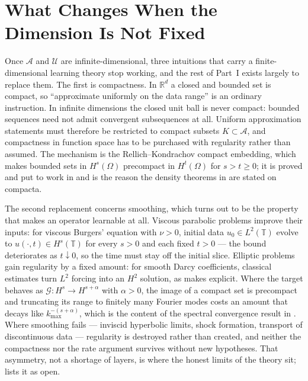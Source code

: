 \section{What Changes When the Dimension Is Not Fixed}

Once $\mathcal{A}$ and $\mathcal{U}$ are infinite-dimensional, three intuitions that carry a
finite-dimensional learning theory stop working, and the rest of Part~I exists largely to
replace them. The first is compactness. In $\mathbb{R}^{d}$ a closed and bounded set is
compact, so ``approximate uniformly on the data range'' is an ordinary instruction. In
infinite dimensions the closed unit ball is never compact: bounded sequences need not admit
convergent subsequences at all. Uniform approximation statements must therefore be restricted
to compact subsets $K \subset \mathcal{A}$, and compactness in function space has to be
purchased with regularity rather than assumed. The mechanism is the Rellich--Kondrachov
compact embedding, which makes bounded sets in $H^{s}(\Omega)$ precompact in
$H^{t}(\Omega)$ for $s > t \ge 0$; it is proved and put to work in
 and is the reason the density
theorems in  are stated on
compacta. 

The second replacement concerns smoothing, which turns out to be the property that makes an
operator learnable at all. Viscous parabolic problems improve their inputs: for viscous
Burgers' equation with $\nu > 0$, initial data $u_{0} \in L^{2}(\mathbb{T})$ evolve to
$u(\cdot, t) \in H^{s}(\mathbb{T})$ for every $s > 0$ and each fixed $t > 0$ --- the
bound deteriorates as $t \downarrow 0$, so the time must stay off the initial slice.
Elliptic problems gain regularity by a
fixed amount: for smooth Darcy coefficients, classical estimates turn $L^{2}$ forcing into an
$H^{2}$ solution, as
 makes explicit. Where the
target behaves as
$\mathcal{G} : H^{s} \to H^{s+\alpha}$ with $\alpha > 0$, the image of a compact set is
precompact and truncating its range to finitely many Fourier modes costs an amount that
decays like $k_{\max}^{-(s+\alpha)}$, which is the content of the spectral convergence result in
 \cite{kovachki2021universal}.
Where smoothing fails --- inviscid hyperbolic limits, shock formation, transport of
discontinuous data --- regularity is destroyed rather than created, and neither the compactness
nor the rate argument survives without new hypotheses. That asymmetry, not a shortage of
layers, is where the honest limits of the theory sit;
 lists it as open.

